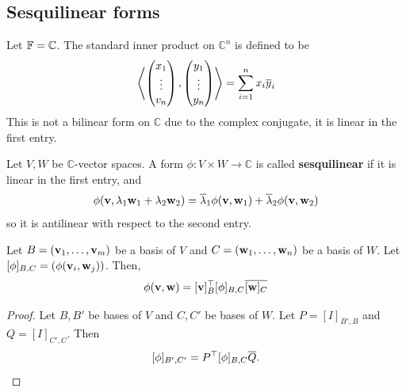 \documentclass[a4paper,11pt]{article}
\begin{document}
\subsection{Sesquilinear forms}
Let \( {\mathbb{F}} = \mathbb C \).
The standard inner product on \( \mathbb C^n \) is defined to be
\[
	\left\langle{\begin{pmatrix} x_1 \\ \vdots \\ v_n \end{pmatrix}, \begin{pmatrix} y_1 \\ \vdots \\ y_n \end{pmatrix}}\right\rangle = \sum_{i=1}^n x_i \overline y_i
\]
This is not a bilinear form on \( \mathbb C \) due to the complex conjugate, it is linear in the first entry.
\begin{definition}
	Let \( V, W \) be \( \mathbb C \)-vector spaces.
	A form \( \phi \colon V \times W \to \mathbb C \) is called \textbf{sesquilinear} if it is linear in the first entry, and
	\[
		\phi({\bf v}, \lambda_1 {\bf w}_1 + \lambda_2 {\bf w}_2) = \overline \lambda_1 \phi({\bf v},{\bf w}_1) + \overline \lambda_2 \phi({\bf v},{\bf w}_2)
	\]
	so it is antilinear with respect to the second entry.
\end{definition}
\begin{lemma}
	Let \( B = ({\bf v}_1, \dots, {\bf v}_m) \) be a basis of \( V \) and \( C = ({\bf w}_1, \dots, {\bf w}_n) \) be a basis of \( W \).
	Let \( [\phi]_{B,C} = \qty(\phi({\bf v}_i, {\bf w}_j)) \).
	Then,
	\[
		\phi({\bf v},{\bf w}) = [{\bf v}]_B^\top [\phi]_{B,C} \overline{[{\bf w}]_C}
	\]
\end{lemma}
\begin{proof}
	Let \( B, B' \) be bases of \( V \) and \( C, C' \) be bases of \( W \).
	Let \( P = [I]_{B', B} \) and \( Q = [I]_{C', C} \).
	Then
	\[
		[\phi]_{B', C'} = P^\top [\phi]_{B,C} \overline Q. \qedhere
	\]
\end{proof}
\end{document}
